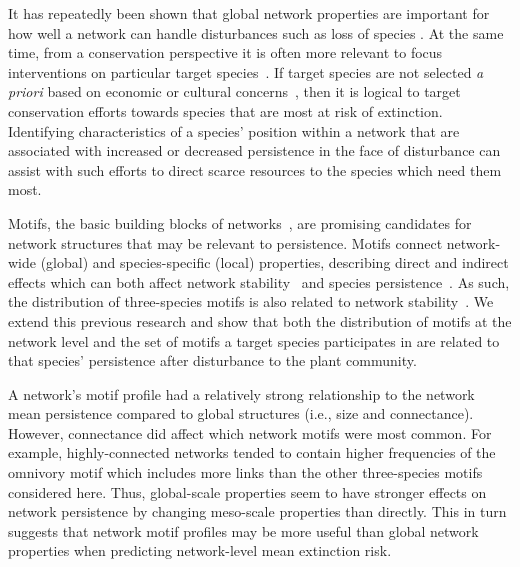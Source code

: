 \documentclass[12pt]{article}
\begin{document}
\begin{spacing}{2.0}


    It has repeatedly been shown that global network properties are important for how well a network can handle disturbances such as loss of species \citep{Eklof2006, Dunne2002}. 
    At the same time, from a conservation perspective it is often more relevant to focus interventions on particular target species~\citep{}. 
    If target species are not selected \emph{a priori} based on economic or cultural concerns~\citep{}, then it is logical to target conservation efforts towards species that are most at risk of extinction.
    Identifying characteristics of a species' position within a network that are associated with increased or decreased persistence in the face of disturbance can assist with such efforts to direct scarce resources to the species which need them most.


    Motifs, the basic building blocks of networks~\citep{Milo2002}, are promising candidates for network structures that may be relevant to persistence.
    Motifs connect network-wide (global) and species-specific (local) properties, describing direct and indirect effects which can both affect network stability~\citep{} and species persistence~\citep{}. 
    As such, the distribution of three-species motifs is also related to network stability~\citep{}.
    We extend this previous research and show that both the distribution of motifs at the network level and the set of motifs a target species participates in are related to that species' persistence after disturbance to the plant community. 

    A network's motif profile had a relatively strong relationship to the network mean persistence compared to global structures (i.e., size and connectance). 
    However, connectance did affect which network motifs were most common. 
    For example, highly-connected networks tended to contain higher frequencies of the omnivory motif which includes more links than the other three-species motifs considered here.
    Thus, global-scale properties seem to have stronger effects on network persistence by changing meso-scale properties than directly.
    This in turn suggests that network motif profiles may be more useful than global network properties when predicting network-level mean extinction risk.


\end{spacing}
\end{document}
